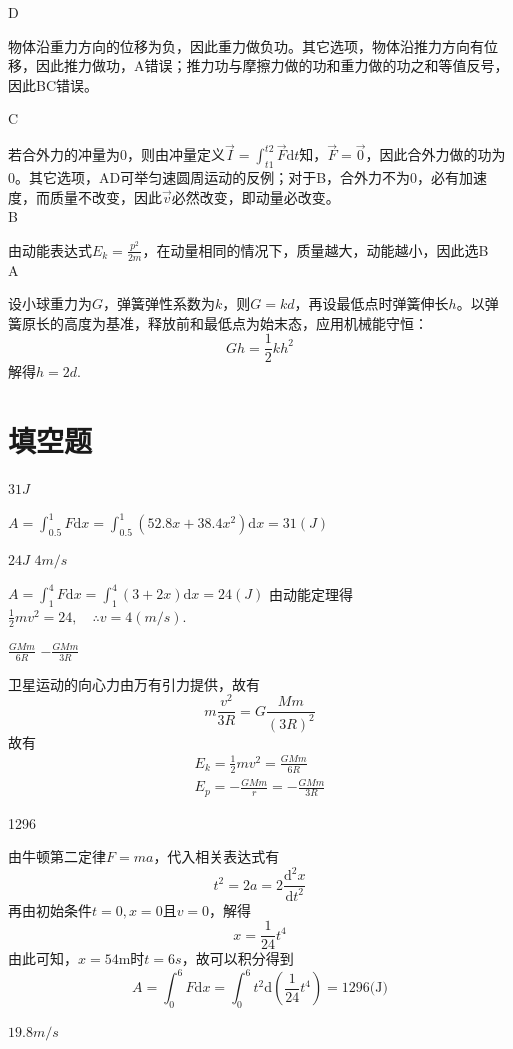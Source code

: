 \documentclass[b5paper,opensource,sourcefont,parskip]{qyxf-book}
\newcommand{\di}[1]{\mathrm{d}#1}
\newcommand{\ddy}[2]{\frac{\mathrm{d} ^2 #1}{\mathrm{d} #2 ^2}}
\begin{document}
D

\solve 物体沿重力方向的位移为负，因此重力做负功。其它选项，物体沿推力方向有位移，因此推力做功，A错误；推力功与摩擦力做的功和重力做的功之和等值反号，因此BC错误。

C

\solve 若合外力的冲量为0，则由冲量定义$\vec{I}=\int_{t1}^{t2}\vec{F}\di{t}$知，$\vec{F}=\vec{0}$，因此合外力做的功为0。其它选项，AD可举匀速圆周运动的反例；对于B，合外力不为0，必有加速度，而质量不改变，因此$\vec{v}$必然改变，即动量必改变。\\

B

\solve 由动能表达式$E_k=\frac{p^2}{2m}$，在动量相同的情况下，质量越大，动能越小，因此选B\\

A

\solve 设小球重力为$G$，弹簧弹性系数为$k$，则$G=kd$，再设最低点时弹簧伸长$h$。以弹簧原长的高度为基准，释放前和最低点为始末态，应用机械能守恒：
\[Gh=\frac{1}{2}kh^2\]
解得$h=2d.$

\section{填空题}

$31J$

\solve $A=\int_{0.5}^{1}F\di{x}=\int_{0.5}^{1}(52.8x+38.4x^2)\di{x}=31(J)$

$24J$ $4m/s$

\solve $A=\int_{1}^{4}F\di{x}=\int_{1}^{4}(3+2x)\di{x}=24(J)$
由动能定理得$\frac{1}{2}mv^2=24,\quad \therefore v=4(m/s)$.

$\frac{GMm}{6R}$ \qquad $-\frac{GMm}{3R}$

\solve 卫星运动的向心力由万有引力提供，故有
\[m\frac{v^2}{3R}=G\frac{Mm}{(3R)^2}\]
故有
\begin{gather*}
E_k=\frac{1}{2}mv^2=\frac{GMm}{6R}\\
E_p=-\frac{GMm}{r}=-\frac{GMm}{3R}
\end{gather*}

1296

\solve
由牛顿第二定律$F=ma$，代入相关表达式有
\[t^2=2a=2\ddy{x}{t}\]
再由初始条件$t=0,x=0$且$v=0$，解得
\[x=\frac{1}{24}t^4\]
由此可知，$x=54$m时$t=6s$，故可以积分得到
\[A=\int_{0}^{6}F\di{x}=\int_{0}^{6}t^2\di{(\frac{1}{24}t^4)}=1296\text{(J)}\]


$19.8m/s$
\end{document}
